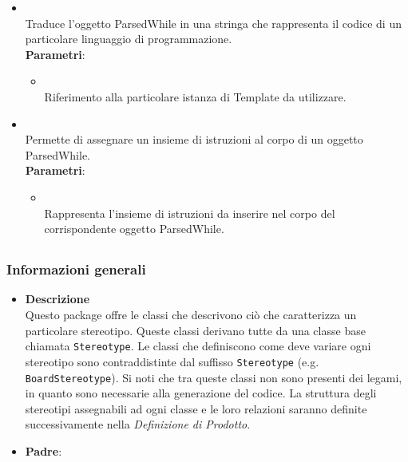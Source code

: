 \begin{itemize}
\begin{itemize}
\begin{itemize}
\end{itemize}
\item {}
\\ Traduce l'oggetto ParsedWhile in una stringa che rappresenta il codice di un particolare linguaggio di programmazione.
\\ \textbf{Parametri}:
\begin{itemize}
\item {}
\\ Riferimento alla particolare istanza di Template da utilizzare.
\end{itemize}
\item {}
\\ Permette di assegnare un insieme di istruzioni al corpo di un oggetto ParsedWhile.
\\ \textbf{Parametri}:
\begin{itemize}
\item {}
\\ Rappresenta l'insieme di istruzioni da inserire nel corpo del corrispondente oggetto ParsedWhile.
\end{itemize}
\end{itemize}
\end{itemize}
\subsection{}
\label{\nogloxy{swedesigner::server::stereotype}}
\subsubsection{Informazioni generali}
\begin{itemize}
\item \textbf{Descrizione}\\
Questo package offre le classi che descrivono ciò che caratterizza un particolare stereotipo. Queste classi derivano tutte da una classe base chiamata \texttt{Stereotype}. Le classi che definiscono come deve variare ogni stereotipo sono contraddistinte dal suffisso \texttt{Stereotype} (e.g. \texttt{BoardStereotype}). Si noti che tra queste classi non sono presenti dei legami, in quanto sono necessarie alla generazione del codice. La struttura degli stereotipi assegnabili ad ogni classe e le loro relazioni saranno definite successivamente nella \emph{Definizione di Prodotto}.
\item \textbf{Padre}: \hyperref[\nogloxy{swedesigner::server}]{}
\end{itemize}

